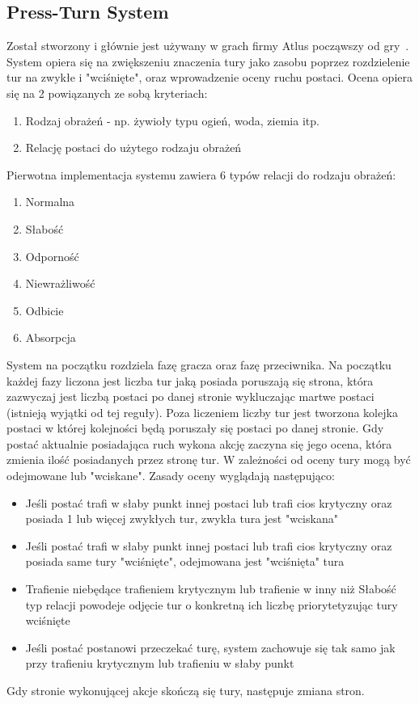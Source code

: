\documentclass{SGGW-thesis}
\begin{document}
\subsection{Press-Turn System}
Został stworzony i głównie jest używany w grach firmy Atlus począwszy od gry~\cite{SMT3}. System opiera się na zwiększeniu znaczenia tury jako zasobu poprzez rozdzielenie tur na zwykłe i "wciśnięte", oraz wprowadzenie oceny ruchu postaci.
Ocena opiera się na 2 powiązanych ze sobą kryteriach:
\begin{enumerate}
  \item{Rodzaj obrażeń - np. żywioły typu ogień, woda, ziemia itp.}
  \item{Relację postaci do użytego rodzaju obrażeń}
\end{enumerate}
Pierwotna implementacja systemu zawiera 6 typów relacji do rodzaju obrażeń:
\begin{enumerate}
  \item{Normalna}
  \item{Słabość}
  \item{Odporność}
  \item{Niewrażliwość}
  \item{Odbicie}
  \item{Absorpcja}
\end{enumerate}
\pagebreak
System na początku rozdziela fazę gracza oraz fazę przeciwnika. Na początku każdej fazy liczona jest liczba tur jaką posiada poruszają się strona, która zazwyczaj jest liczbą postaci po danej stronie wykluczając martwe postaci (istnieją wyjątki od tej reguły).
Poza liczeniem liczby tur jest tworzona kolejka postaci w której kolejności będą poruszały się postaci po danej stronie. Gdy postać aktualnie posiadająca ruch wykona akcję zaczyna się jego ocena, która zmienia ilość posiadanych przez stronę tur.
W zależności od oceny tury mogą być odejmowane lub "wciskane". Zasady oceny wyglądają następująco:
\begin{itemize}
  \item{Jeśli postać trafi w słaby punkt innej postaci lub trafi cios krytyczny oraz posiada 1 lub więcej zwykłych tur, zwykła tura jest "wciskana"}
  \item{Jeśli postać trafi w słaby punkt innej postaci lub trafi cios krytyczny oraz posiada same tury "wciśnięte", odejmowana jest "wciśnięta" tura}
  \item{Trafienie niebędące trafieniem krytycznym lub trafienie w inny niż Słabość typ relacji powodeje odjęcie tur o konkretną ich liczbę priorytetyzując tury wciśnięte}
  \item{Jeśli postać postanowi przeczekać turę, system zachowuje się tak samo jak przy trafieniu krytycznym lub trafieniu w słaby punkt}
\end{itemize}
Gdy stronie wykonującej akcje skończą się tury, następuje zmiana stron.
\end{document}
